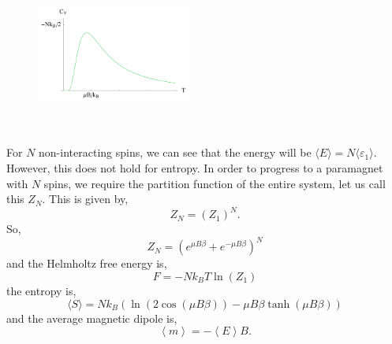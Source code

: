 \documentclass{book}
\begin{document}
\begin{figure}
	\centering
	\includegraphics[width=0.45\textwidth]{cv.png}
	\caption{}
	\label{fig:cv}
\end{figure}
\\\\
For $N$ non-interacting spins, we can see that the energy will be $\langle E \rangle = N \langle \varepsilon_1 \rangle$. However, this does not hold for entropy. In order to progress to a paramagnet with $N$ spins, we require the partition function of the entire system, let us call this $Z_N$. This is given by,
\begin{equation}
	Z_N = (Z_1)^N.
\end{equation}
So,
\begin{equation}
	Z_N = \left(e^{\mu B \beta} + e^{-\mu B \beta}\right)^N
\end{equation}
and the Helmholtz free energy is,
\begin{equation}
	F = -Nk_BT\ln(Z_1)
\end{equation}
the entropy is,
\begin{equation}
	\langle S \rangle = N k_B \left(\ln(2\cos(\mu B \beta)) -\mu B \beta \tanh (\mu B \beta)\right)
\end{equation}
and the average magnetic dipole is,
\begin{equation}
	\left<m \right> = -\left<E\right>B.
\end{equation}
\end{document}
